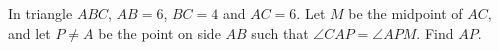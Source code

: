 In triangle $ABC$, $AB=6$, $BC=4$ and $AC=6$. Let $M$ be the midpoint of $AC$, and let $P\ne A$ be the point on side $AB$ such that $\angle CAP=\angle APM$. Find $AP$.
